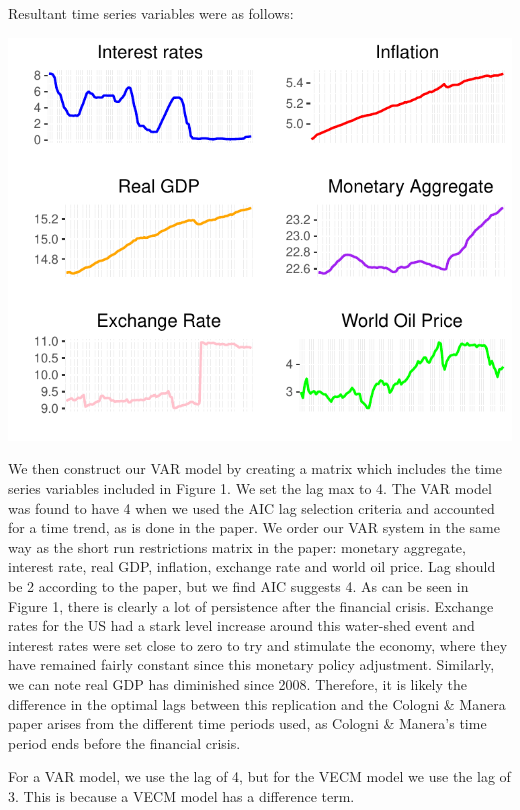 \documentclass[11pt,preprint, authoryear]{elsarticle}
\numberwithin{equation}{section}
\numberwithin{figure}{section}
\numberwithin{table}{section}
\begin{document}
Resultant time series variables were as follows:

\begin{center}\includegraphics{README_files/figure-latex/unnamed-chunk-1-1} \end{center}

We then construct our VAR model by creating a matrix which includes the
time series variables included in Figure 1. We set the lag max to 4. The
VAR model was found to have 4 when we used the AIC lag selection
criteria and accounted for a time trend, as is done in the paper. We
order our VAR system in the same way as the short run restrictions
matrix in the paper: monetary aggregate, interest rate, real GDP,
inflation, exchange rate and world oil price. Lag should be 2 according
to the paper, but we find AIC suggests 4. As can be seen in Figure 1,
there is clearly a lot of persistence after the financial crisis.
Exchange rates for the US had a stark level increase around this
water-shed event and interest rates were set close to zero to try and
stimulate the economy, where they have remained fairly constant since
this monetary policy adjustment. Similarly, we can note real GDP has
diminished since 2008. Therefore, it is likely the difference in the
optimal lags between this replication and the Cologni \& Manera paper
arises from the different time periods used, as Cologni \& Manera's time
period ends before the financial crisis.

For a VAR model, we use the lag of 4, but for the VECM model we use the
lag of 3. This is because a VECM model has a difference term.
\end{document}
